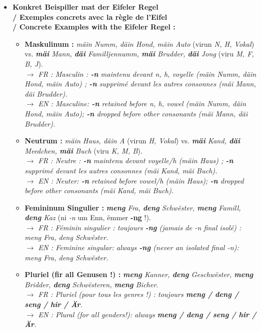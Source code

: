 \begin{itemize}
    \item \textbf{Konkret Beispiller mat der Eifeler Regel \\
    / Exemples concrets avec la règle de l'Eifel \\
    / Concrete Examples with the Eifeler Regel :}
    \begin{itemize}
        \item \textbf{Maskulinum :} \textit{mäin Numm, däin Hond, mäin Auto} (virun \textit{N, H, Vokal}) vs. \textit{\textbf{mäi} Mann, \textbf{däi} Familljennumm, \textbf{mäi} Brudder, \textbf{däi} Jong} (viru \textit{M, F, B, J}). \\
        $\rightarrow$ \textit{FR : Masculin : \textbf{-n} maintenu devant n, h, voyelle (\textit{mäin Numm, däin Hond, mäin Auto}) ; \textbf{-n} supprimé devant les autres consonnes (\textit{mäi Mann, däi Brudder}).} \\
        $\rightarrow$ \textit{EN : Masculine: \textbf{-n} retained before n, h, vowel (\textit{mäin Numm, däin Hond, mäin Auto}); \textbf{-n} dropped before other consonants (\textit{mäi Mann, däi Brudder}).}
        \item \textbf{Neutrum :} \textit{mäin Haus, däin A} (virun \textit{H, Vokal}) vs. \textit{\textbf{mäi} Kand, \textbf{däi} Meedchen, \textbf{mäi} Buch} (viru \textit{K, M, B}). \\
        $\rightarrow$ \textit{FR : Neutre : \textbf{-n} maintenu devant voyelle/h (\textit{mäin Haus}) ; \textbf{-n} supprimé devant les autres consonnes (\textit{mäi Kand, mäi Buch}).} \\
        $\rightarrow$ \textit{EN : Neuter: \textbf{-n} retained before vowel/h (\textit{mäin Haus}); \textbf{-n} dropped before other consonants (\textit{mäi Kand, mäi Buch}).}
        \item \textbf{Femininum Singulier :} \textit{\textbf{meng} Fra, \textbf{deng} Schwëster, \textbf{meng} Famill, \textbf{deng} Kaz} (ni \textit{-n} um Enn, ëmmer \textbf{-ng} !). \\
        $\rightarrow$ \textit{FR : Féminin singulier : toujours \textbf{-ng} (jamais de \textit{-n} final isolé) : \textit{meng Fra, deng Schwëster}.} \\
        $\rightarrow$ \textit{EN : Feminine singular: always \textbf{-ng} (never an isolated final \textit{-n}): \textit{meng Fra, deng Schwëster}.}
        \item \textbf{Pluriel (fir all Genusen !) :} \textit{\textbf{meng} Kanner, \textbf{deng} Geschwëster, \textbf{meng} Bridder, \textbf{deng} Schwësteren, \textbf{meng} Bicher}. \\
        $\rightarrow$ \textit{FR : Pluriel (pour tous les genres !) : toujours \textbf{meng / deng / seng / hir / Är}.} \\
        $\rightarrow$ \textit{EN : Plural (for all genders!): always \textbf{meng / deng / seng / hir / Är}.}
    \end{itemize}
\end{itemize}

